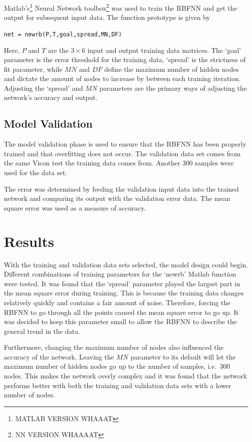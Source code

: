 Matlab's\footnote{MATLAB VERSION WHAAAT} Neural Network toolbox\footnote{NN VERSION WHAAAAT} was used to train the RBFNN and get the output for subsequent input data. The function prototype is given by 

\begin{center}
  \verb|net = newrb(P,T,goal,spread,MN,DF)|
\end{center}

Here, $P$ and $T$ are the $3\times6$ input and output training data matrices. The `goal' parameter is the error threshold for the training data, `spread' is the strictness of fit parameter, while $MN$ and $DF$ define the maximum number of hidden nodes and dictate the amount of nodes to increase by between each training iteration. Adjusting the `spread' and $MN$ parameters are the primary ways of adjusting the network's accuracy and output. 

\subsection{Model Validation}

The model validation phase is used to ensure that the RBFNN has been properly trained and that overfitting does not occur. The validation data set comes from the same Vicon test the training data comes from. Another 300 samples were used for the data set. 

The error was determined by feeding the validation input data into the trained network and comparing its output with the validation error data. The mean square error was used as a measure of accuracy. 

\section{Results}

With the training and validation data sets selected, the model design could begin. Different combinations of training parameters for the `newrb' Matlab function were tested. It was found that the `spread' parameter played the largest part in the mean square error during training. This is because the training data changes relatively quickly and contains a fair amount of noise. Therefore, forcing the RBFNN to go through all the points caused the mean square error to go up. It was decided to keep this parameter small to allow the RBFNN to describe the general trend in the data. 

Furthermore, changing the maximum number of nodes also influenced the accuracy of the network. Leaving the $MN$ parameter to its default will let the maximum number of hidden nodes go up to the number of samples, i.e.\ 300 nodes. This makes the network overly complex and it was found that the network performs better with both the training and validation data sets with a lower number of nodes. 

